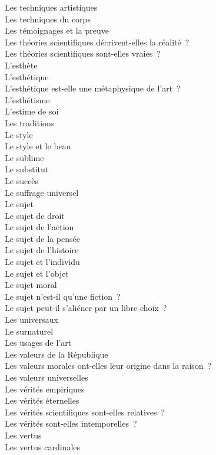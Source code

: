 \documentclass[a4paper,12pt]{article}
\begin{document}
Les techniques artistiques \\
Les techniques du corps \\
Les témoignages et la preuve \\
Les théories scientifiques décrivent-elles la réalité ? \\
Les théories scientifiques sont-elles vraies ? \\
L'esthète \\
L'esthétique \\
L'esthétique est-elle une métaphysique de l'art ? \\
L'esthétisme \\
L'estime de soi \\
Les traditions \\
Le style \\
Le style et le beau \\
Le sublime \\
Le substitut \\
Le succès \\
Le suffrage universel \\
Le sujet \\
Le sujet de droit \\
Le sujet de l'action \\
Le sujet de la pensée \\
Le sujet de l'histoire \\
Le sujet et l'individu \\
Le sujet et l'objet \\
Le sujet moral \\
Le sujet n'est-il qu'une fiction ? \\
Le sujet peut-il s'aliéner par un libre choix ? \\
Les universaux \\
Le surnaturel \\
Les usages de l'art \\
Les valeurs de la République \\
Les valeurs morales ont-elles leur origine dans la raison ? \\
Les valeurs universelles \\
Les vérités empiriques \\
Les vérités éternelles \\
Les vérités scientifiques sont-elles relatives ? \\
Les vérités sont-elles intemporelles ? \\
Les vertus \\
Les vertus cardinales \\
\end{document}
